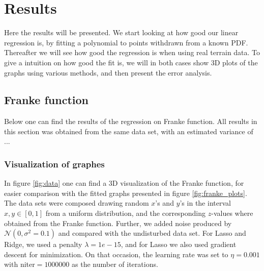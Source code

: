 \section{Results} \label{sec:results}
Here the results will be presented. We start looking at how good our linear regression is, by fitting a polynomial to points withdrawn from a known PDF. Thereafter we will see how good the regression is when using real terrain data. To give a intuition on how good the fit is, we will in both cases show 3D plots of the graphs using various methods, and then present the error analysis. 

\subsection{Franke function}
Below one can find the results of the regression on Franke function. All results in this section was obtained from the same data set, with an estimated variance of ...

\subsubsection{Visualization of graphes}
In figure \eqref{fig:data} one can find a 3D visualization of the Franke function, for easier comparison with the fitted graphs presented in figure \eqref{fig:franke_plots}. The data sets were composed drawing random $x$'s and $y$'s in the interval $x,y\in[0,1]$ from a uniform distribution, and the corresponding $z$-values where obtained from the Franke function. Further, we added noise produced by $\mathcal{N}(0, \sigma^2=0.1)$ and compared with the undisturbed data set. For Lasso and Ridge, we used a penalty $\lambda=1e-15$, and for Lasso we also used gradient descent for minimization. On that occasion, the learning rate was set to $\eta=0.001$ with niter$=1000000$ as the number of iterations. 

